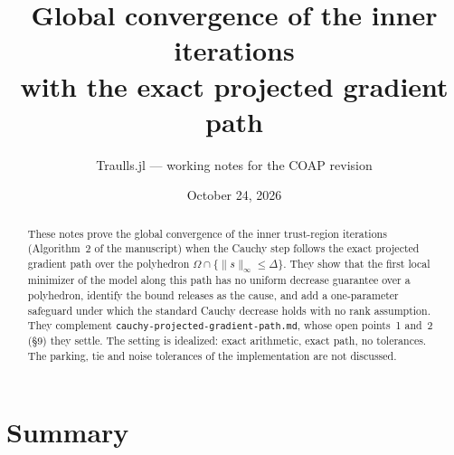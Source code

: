 \documentclass[11pt,a4paper]{article}
\title{Global convergence of the inner iterations\\with the exact projected gradient path}
\author{Traulls.jl --- working notes for the COAP revision}
\date{October 24, 2026}
\numberwithin{equation}{section}
\theoremstyle{plain}
\theoremstyle{definition}
\theoremstyle{remark}
\newcommand{\codeus}{\textunderscore\allowbreak}
\newcommand{\code}[1]{{\let\_\codeus\texttt{#1}}}
\begin{document}
\maketitle

\begin{abstract}
These notes prove the global convergence of the inner trust-region iterations
(Algorithm~2 of the manuscript) when the Cauchy step follows the exact projected gradient
path over the polyhedron $\Omega\cap\{\|s\|_\infty\le\Delta\}$. They show that the first local
minimizer of the model along this path has no uniform decrease guarantee over a polyhedron,
identify the bound releases as the cause, and add a one-parameter safeguard under which the
standard Cauchy decrease holds with no rank assumption. They complement
\code{cauchy-projected-gradient-path.md}, whose open points~1 and~2 (§9) they settle. The
setting is idealized: exact arithmetic, exact path, no tolerances. The parking, tie and noise
tolerances of the implementation are not discussed.
\end{abstract}

\section*{Summary}
\end{document}
